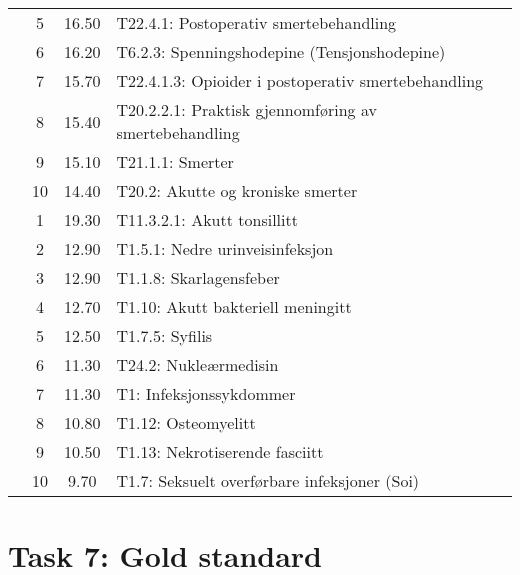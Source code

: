\begin{table}[htbp]
\begin{tabular}{c c c l}
     & 5 & 16.50 & T22.4.1: Postoperativ smertebehandling \\
     & 6 & 16.20 & T6.2.3: Spenningshodepine (Tensjonshodepine) \\
     & 7 & 15.70 & T22.4.1.3: Opioider i postoperativ smertebehandling \\
     & 8 & 15.40 & T20.2.2.1: Praktisk gjennomføring av smertebehandling \\%
     & 9 & 15.10 & T21.1.1: Smerter \\
     & 10 & 14.40 & T20.2: Akutte og kroniske smerter \\
	\addlinespace
    8 & 1 & 19.30 & T11.3.2.1: Akutt tonsillitt \\
     & 2 & 12.90 & T1.5.1: Nedre urinveisinfeksjon \\
     & 3 & 12.90 & T1.1.8: Skarlagensfeber \\
     & 4 & 12.70 & T1.10: Akutt bakteriell meningitt \\
     & 5 & 12.50 & T1.7.5: Syfilis \\
     & 6 & 11.30 & T24.2: Nukleærmedisin \\
     & 7 & 11.30 & T1: Infeksjonssykdommer \\
     & 8 & 10.80 & T1.12: Osteomyelitt \\
     & 9 & 10.50 & T1.13: Nekrotiserende fasciitt \\
     & 10 & 9.70 & T1.7: Seksuelt overførbare infeksjoner (Soi) \\
	\bottomrule
\end{tabular}
\end{table}


\section{Task 7: Gold standard}


